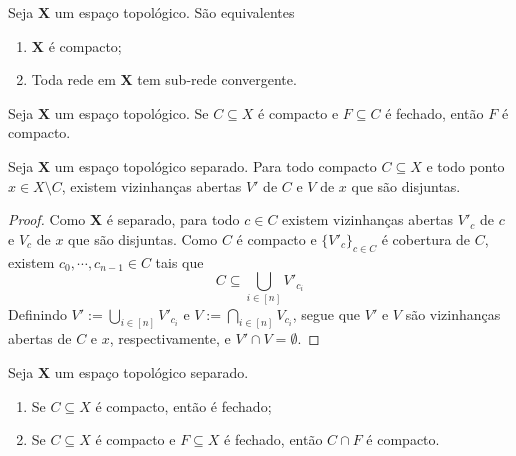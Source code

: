 \begin{prop}
Seja $\bm X$ um espaço topológico. São equivalentes
	\begin{enumerate}
	\item $\bm X$ é compacto;
	\item Toda rede em $\bm X$ tem sub-rede convergente.
	\end{enumerate}
\end{prop}

\begin{prop}
Seja $\bm X$ um espaço topológico. Se $C \subseteq X$ é compacto e $F \subseteq C$ é fechado, então $F$ é compacto.
\end{prop}

\begin{prop}
\label{topo:prop.esp.sep.comp.pont}
Seja $\bm X$ um espaço topológico separado. Para todo compacto $C \subseteq X$ e todo ponto $x \in X \setminus C$, existem vizinhanças abertas $V'$ de $C$ e $V$ de $x$ que são disjuntas.
\end{prop}
\begin{proof}
Como $\bm X$ é separado, para todo $c \in C$ existem vizinhanças abertas $V'_c$ de $c$ e $V_c$ de $x$ que são disjuntas. Como $C$ é compacto e $\{V'_c\}_{c \in C}$ é cobertura de $C$, existem $c_0,\cdots,c_{n-1} \in C$ tais que
	\begin{equation*}
	C \subseteq \bigcup_{i \in [n]} V'_{c_i}
	\end{equation*}
Definindo $V' := \bigcup_{i \in [n]} V'_{c_i}$ e $V := \bigcap_{i \in [n]} V_{c_i}$, segue que $V'$ e $V$ são vizinhanças abertas de $C$ e $x$, respectivamente, e $V' \cap V = \emptyset$.
\end{proof}

\begin{prop}
Seja $\bm X$ um espaço topológico separado.
	\begin{enumerate}
	\item Se $C \subseteq X$ é compacto, então é fechado;
	\item Se $C \subseteq X$ é compacto e $F \subseteq X$ é fechado, então $C \cap F$ é compacto.
	\end{enumerate}
\end{prop}

